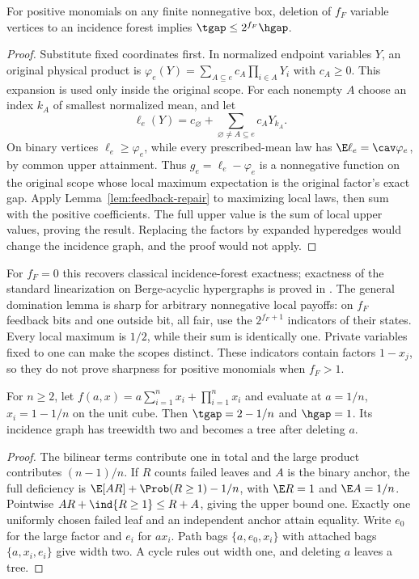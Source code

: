 \begin{theorem}\label{thm:feedback}
For positive monomials on any finite nonnegative box, deletion of $f_F$
variable vertices to an incidence forest implies $\tgap\le2^{f_F}\hgap$.
\end{theorem}
\begin{proof}
Substitute fixed coordinates first. In normalized endpoint variables $Y$,
an original physical product is $\varphi_e(Y)=\sum_{A\subseteq e}
c_A\prod_{i\in A}Y_i$ with $c_A\ge0$. This expansion is used only
inside the original scope. For each nonempty $A$ choose an index $k_A$
of smallest normalized mean, and let
\[
 \ell_e(Y)=c_\varnothing+\sum_{\varnothing\ne A\subseteq e}c_AY_{k_A}.
\]
On binary vertices $\ell_e\ge\varphi_e$, while every prescribed-mean
law has $\E\ell_e=\cav\varphi_e$, by common upper attainment.
Thus $g_e=\ell_e-\varphi_e$ is a nonnegative function on the original
scope whose local maximum expectation is the original factor's exact
gap. Apply Lemma~\ref{lem:feedback-repair} to maximizing local laws,
then sum with the positive coefficients. The full upper value is the
sum of local upper values, proving the result. Replacing the factors by
expanded hyperedges would change the incidence
graph, and the proof would not apply.
\end{proof}

For $f_F=0$ this recovers classical incidence-forest exactness; exactness
of the standard linearization on Berge-acyclic hypergraphs is proved in
\citet{DelPiaKhajavirad2018}. The general domination lemma is sharp
for arbitrary nonnegative local payoffs: on $f_F$ feedback bits and one
outside bit, all fair, use the $2^{f_F+1}$ indicators of their states.
Every local maximum is $1/2$, while their sum is identically one.
Private variables fixed to one can make the scopes distinct. These
indicators contain factors $1-x_j$, so they do not prove sharpness
for positive monomials when $f_F>1$.

\begin{proposition}\label{prop:feedback-sharp}
For $n\ge2$, let $f(a,x)=a\sum_{i=1}^nx_i+\prod_{i=1}^nx_i$ and evaluate
at $a=1/n$, $x_i=1-1/n$ on the unit cube. Then
$\tgap=2-1/n$ and $\hgap=1$. Its incidence graph has treewidth two and
becomes a tree after deleting $a$.
\end{proposition}
\begin{proof}
The bilinear terms contribute one in total and the large product
contributes $(n-1)/n$. If $R$ counts failed leaves and $A$ is the
binary anchor, the full deficiency is
$\E[AR]+\Prob(R\ge1)-1/n$, with $\E R=1$ and $\E A=1/n$.
Pointwise $AR+\ind\{R\ge1\}\le R+A$, giving the upper bound one.
Exactly one uniformly chosen failed leaf and an independent anchor
attain equality. Write $e_0$ for the large factor and $e_i$ for $ax_i$.
Path bags $\{a,e_0,x_i\}$ with attached bags $\{a,x_i,e_i\}$ give width
two. A cycle rules out width one, and deleting $a$ leaves a tree.
\end{proof}

